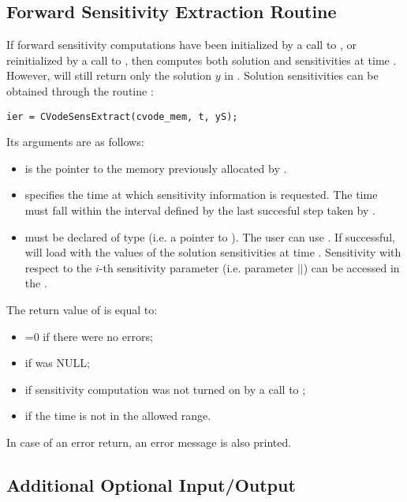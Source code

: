 \subsection{Forward Sensitivity Extraction Routine}\label{sss:cvodesensextract}

If forward sensitivity computations have been initialized by a call to ,
or reinitialized by a call to , then {\cvodes} computes both solution
and sensitivities at time . However,  will still return only the solution
$y$ in . Solution sensitivities can be obtained through the routine
:
\begin{verbatim}
ier = CVodeSensExtract(cvode_mem, t, yS);
\end{verbatim}
Its arguments are as follows:
\begin{itemize}
\item {} is the pointer to the memory previously allocated
  by .
\item {} specifies the time at which sensitivity information is 
  requested. The time  must fall within the interval defined by the last 
  succesful step taken by {\cvodes}.
\item {} must be declared of type  (i.e. a pointer to 
  ). The user can use . 
  If successful,  will load  with the values of the
  solution sensitivities at time . Sensitivity with respect to the $i$-th
  sensitivity parameter (i.e. parameter \id{p[}$|$$|$\id{-1]}) can be accessed in
  the  .
\end{itemize}
The return value  of  is equal to: 
\begin{itemize}
\item {}=0 if there were no errors; 
\item {} if  was NULL;
\item {} if sensitivity computation was not turned on
      by a call to ;
\item {} if the time  is not in the allowed range.
\end{itemize}
In case of an error return, an error message is also printed.  

\subsection{Additional Optional Input/Output}\label{sss:more_optional_io}

